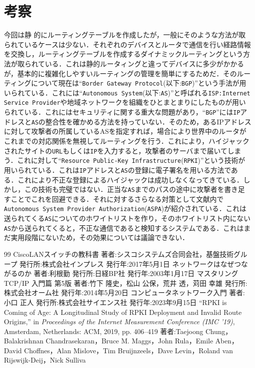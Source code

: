 \documentclass{jlreq}
\begin{document}
  \section{考察}
  今回は静
  的にルーティングテーブルを作成したが，一般にそのような方法が取られているケースは少ない．それぞれのデバイスとルータで通信を行い経路情報を交換し，ルーティングテーブルを作成するダイナミックルーティングという方法が取られている．これは静的ルータィングと違ってデバイスに多少がかかるが，基本的に複雑化しやすいルーティングの管理を簡単にするためだ．そのルーティングについて現在は``\verb|Border Gateway Protocol|(以下:\verb|BGP|)''という手法が用いられている．これには``\verb|Autonomous System|(以下:\verb|AS|)''と呼ばれる\verb|ISP:Internet Service Provider|や地域ネットワークを組織をひとまとまりにしたものが用いられている\cite{mastaring_TCP/IP}．これにはセキュリティに関する重大な問題があり，``\verb|BGP|''には\verb|IP|アドレスと\verb|AS|の整合性を確かめる方法を持っていない．そのため，あるIPアドレスに対して攻撃者の所属しているASを指定すれば，場合により世界中のルータがこれまでの対応関係を無視してルーティングを行う．これにより，ハイジャックされたサイトの\verb|URL|もしくは\verb|IP|を入力すると，攻撃者のサーバまで届いてしまう．これに対して``\verb|Resource Public-Key Infrastructure|(\verb|RPKI|)''という技術が用いられている．これは\verb|IP|アドレスと\verb|AS|の登録に電子署名を用いる方法である．これにより不正な登録によるハイジャックは成功しなくなってきている\cite{RPKI}．しかし，この技術も完璧ではない．正当な\verb|AS|までのパスの途中に攻撃者を書き足すことでこれを回避できる．それに対するさらなる対策として文献\cite{RPKI}内で\verb|Autonomous System Provider Authorization|(\verb|ASPA|)が紹介されている．これは送られてくる\verb|AS|についてのホワイトリストを作り，そのホワイトリスト内にない\verb|AS|から送られてくると，不正な通信であると検知するシステムである．これはまだ実用段階にないため，その効果については議論できない．
\begin{thebibliography}{99}
   CiscoLANスイッチの教科書 著者:シスコシステムズ合同会社，基盤技術グループ 発行所:株式会社インプレス 発行年:2017年5月1日
   ネットワークはなぜつながるのか 著者:利根勤 発行所:日経BP社 発行年:2003年1月17日
   マスタリングTCP/IP 入門篇 第5版 著者:竹下 隆史，松山 公保，荒井 透，苅田 幸雄 発行所:株式会社オーム社 発行年:2014年5月20日
   コンピュータネットワーク入門 著者:小口 正人 発行所:株式会社サイエンス社 発行年:2023年9月15日
   ``RPKI is Coming of Age: A Longitudinal Study of RPKI Deployment and Invalid Route Origins,'' in \textit{Proceedings of the Internet Measurement Conference (IMC '19)}, Amsterdam, Netherlands: ACM, 2019, pp. 406--419 著者:Taejoong Chung，Balakrishnan Chandrasekaran，Bruce M. Maggs，John Rula，Emile Aben，David Choffnes，Alan Mislove，Tim Bruijnzeels，Dave Levin，Roland van Rijswijk-Deij，Nick Sulliva

\end{thebibliography}
\end{document}
